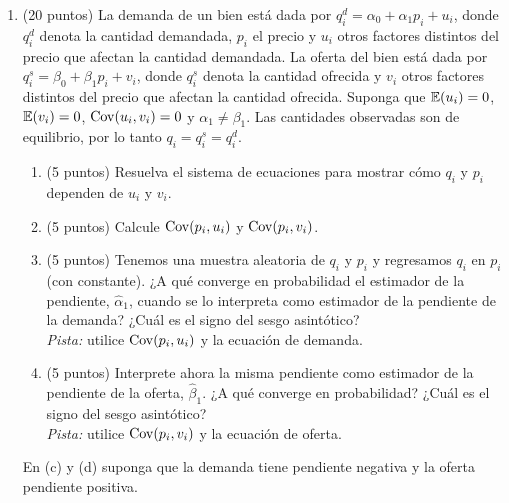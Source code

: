 \documentclass[letterpaper,11pt]{article}
\begin{document}
\begin{enumerate}
\item (20 puntos) La demanda de un bien está dada por $q_i^d=\alpha_0+\alpha_1 p_i+u_i$, donde
    $q_i^d$ denota la cantidad demandada, $p_i$ el precio y $u_i$ otros factores distintos del
    precio que afectan la cantidad demandada. La oferta del bien está dada por
    $q_i^s=\beta_0+\beta_1 p_i+v_i$, donde $q_i^s$ denota la cantidad ofrecida y $v_i$ otros
    factores distintos del precio que afectan la cantidad ofrecida. Suponga que $\operatorname{\mathbb{E}}(u_i)=0$,
    $\operatorname{\mathbb{E}}(v_i)=0$, $\operatorname{Cov}(u_i,v_i)=0$ y $\alpha_1\neq\beta_1$. Las cantidades observadas son de
    equilibrio, por lo tanto $q_i=q_i^s=q_i^d$.
    \begin{enumerate}
        \item (5 puntos) Resuelva el sistema de ecuaciones para mostrar cómo $q_i$ y $p_i$
            dependen de $u_i$ y $v_i$.
        \item (5 puntos) Calcule $\operatorname{Cov}(p_i,u_i)$ y $\operatorname{Cov}(p_i,v_i)$.
        \item (5 puntos) Tenemos una muestra aleatoria de $q_i$ y $p_i$ y regresamos $q_i$ en
            $p_i$ (con constante). ¿A qué converge en probabilidad el estimador de la pendiente,
            $\hat\alpha_1$, cuando se lo interpreta como estimador de la pendiente de la
            demanda? ¿Cuál es el signo del sesgo asintótico?\\
            \emph{Pista:} utilice $\operatorname{Cov}(p_i,u_i)$ y la ecuación de demanda.
        \item (5 puntos) Interprete ahora la misma pendiente como estimador de la pendiente de
            la oferta, $\hat\beta_1$. ¿A qué converge en probabilidad? ¿Cuál es el signo del
            sesgo asintótico?\\
            \emph{Pista:} utilice $\operatorname{Cov}(p_i,v_i)$ y la ecuación de oferta.
    \end{enumerate}
    En (c) y (d) suponga que la demanda tiene pendiente negativa y la oferta pendiente positiva.


\end{enumerate}
\end{document}
